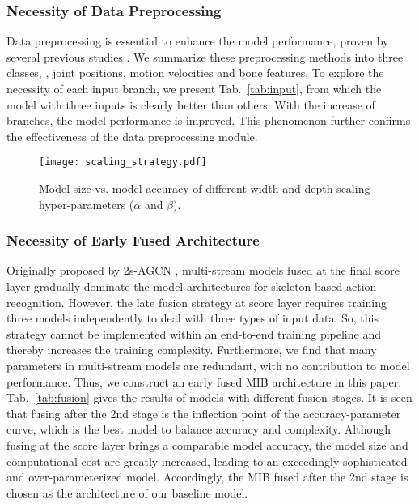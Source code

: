 \documentclass[10pt,journal,compsoc]{IEEEtran}
\begin{document}
\subsubsection{Necessity of Data Preprocessing}
\label{sssec:compare_input}

Data preprocessing is essential to enhance the model performance, proven by several previous studies \cite{song2019richly,si2018skeleton,shi2019two}. We summarize these preprocessing methods into three classes, \ie, joint positions, motion velocities and bone features. To explore the necessity of each input branch, we present Tab.~\ref{tab:input}, from which the model with three inputs is clearly better than others. With the increase of branches, the model performance is improved. This phenomenon further confirms the effectiveness of the data preprocessing module.

\begin{figure}[t]
  \centerline{\texttt{[image: scaling\_strategy.pdf]}}
  \vspace{-0.4cm}
  \caption{Model size vs. model accuracy of different width and depth scaling hyper-parameters ($\alpha$ and $\beta$). \bv}\label{fig:scaling}
\end{figure}

\subsubsection{Necessity of Early Fused Architecture}
\label{sssec:compare_fusion}

Originally proposed by 2s-AGCN \cite{shi2019two}, multi-stream models fused at the final score layer gradually dominate the model architectures for skeleton-based action recognition. However, the late fusion strategy at score layer requires training three models independently to deal with three types of input data. So, this strategy cannot be implemented within an end-to-end training pipeline and thereby increases the training complexity. Furthermore, we find that many parameters in multi-stream models are redundant, with no contribution to model performance. Thus, we construct an early fused MIB architecture in this paper. Tab.~\ref{tab:fusion} gives the results of models with different fusion stages. It is seen that fusing after the 2nd stage is the inflection point of the accuracy-parameter curve, which is the best model to balance accuracy and complexity. Although fusing at the score layer brings a comparable model accuracy, the model size and computational cost are greatly increased, leading to an exceedingly sophisticated and over-parameterized model. Accordingly, the MIB fused after the 2nd stage is chosen as the architecture of our baseline model.
\end{document}
